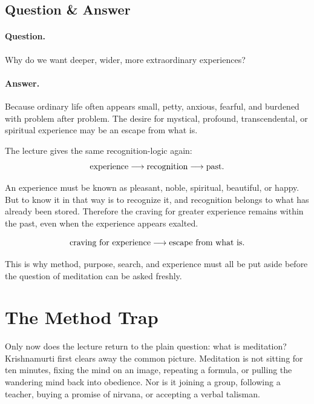 \documentclass[11pt,oneside]{book}
\begin{document}
\subsection{Question \& Answer}

\paragraph{Question.}
Why do we want deeper, wider, more extraordinary experiences?

\paragraph{Answer.}
Because ordinary life often appears small, petty, anxious, fearful, and burdened with problem after problem. The desire for mystical, profound, transcendental, or spiritual experience may be an escape from what is.

The lecture gives the same recognition-logic again:
\begin{equation}
\hbox{experience}
\longrightarrow
\hbox{recognition}
\longrightarrow
\hbox{past}.
\end{equation}

An experience must be known as pleasant, noble, spiritual, beautiful, or happy. But to know it in that way is to recognize it, and recognition belongs to what has already been stored. Therefore the craving for greater experience remains within the past, even when the experience appears exalted.

\begin{equation}
\hbox{craving for experience}
\longrightarrow
\hbox{escape from what is}.
\end{equation}

This is why method, purpose, search, and experience must all be put aside before the question of meditation can be asked freshly.

\section{The Method Trap}

Only now does the lecture return to the plain question: what is meditation? Krishnamurti first clears away the common picture. Meditation is not sitting for ten minutes, fixing the mind on an image, repeating a formula, or pulling the wandering mind back into obedience. Nor is it joining a group, following a teacher, buying a promise of nirvana, or accepting a verbal talisman.
\end{document}
